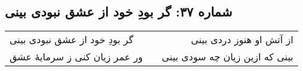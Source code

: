 \begin{center}
\section*{شماره ۳۷: گر بودِ خود از عشق نبودی بینی}
\label{sec:037}
\begin{longtable}{l p{0.5cm} r}
گر بودِ خود از عشق نبودی بینی
&&
از آتش او هنوز دردی بینی
\\
ور عمر زیان کنی ز سرمایهٔ عشق
&&
بینی که ازین زیان چه سودی بینی
\\
\end{longtable}
\end{center}
